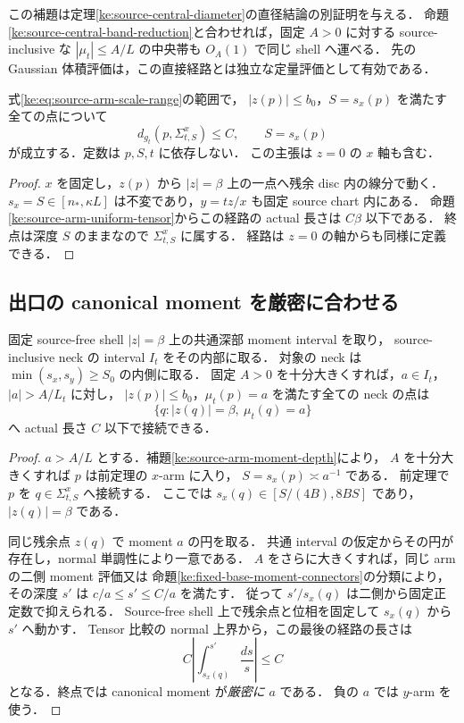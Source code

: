 この補題は定理\ref{ke:source-central-diameter}の直径結論の別証明を与える．
命題\ref{ke:source-central-band-reduction}と合わせれば，固定 $A>0$ に対する
source-inclusive な $|\mu_t|\le A/L$ の中央帯も $O_A(1)$ で同じ shell へ運べる．
先の Gaussian 体積評価は，この直接経路とは独立な定量評価として有効である．

\begin{theorem}
\label{ke:source-noncentral-shell-exit}
式\eqref{ke:eq:source-arm-scale-range}の範囲で，
$|z(p)|\le b_0$，$S=s_x(p)$ を満たす全ての点について
\begin{equation}\label{ke:eq:source-noncentral-shell-exit}
 d_{g_t}(p,\Sigma^x_{t,S})
 \le C,\qquad S=s_x(p)
\end{equation}
が成立する．定数は $p,S,t$ に依存しない．
この主張は $z=0$ の $x$ 軸も含む．
\end{theorem}

\begin{proof}
$x$ を固定し，$z(p)$ から $|z|=\beta$ 上の一点へ残余 disc 内の線分で動く．
$s_x=S\in[n_*,\kappa L]$ は不変であり，$y=tz/x$ も固定 source chart 内にある．
命題\ref{ke:source-arm-uniform-tensor}からこの経路の actual 長さは $C\beta$ 以下である．
終点は深度 $S$ のままなので $\Sigma^x_{t,S}$ に属する．
経路は $z=0$ の軸からも同様に定義できる．
\end{proof}

\subsection{出口の canonical moment を厳密に合わせる}

\begin{proposition}
\label{ke:source-noncentral-same-moment-exit}
固定 source-free shell $|z|=\beta$ 上の共通深部 moment interval を取り，
source-inclusive neck の interval $I_t$ をその内部に取る．
対象の neck は $\min(s_x,s_y)\ge S_0$ の内側に取る．
固定 $A>0$ を十分大きくすれば，$a\in I_t$，$|a|>A/L_t$ に対し，
$|z(p)|\le b_0$，$\mu_t(p)=a$ を満たす全ての neck の点は
\[
 \{q:|z(q)|=\beta,\ \mu_t(q)=a\}
\]
へ actual 長さ $C$ 以下で接続できる．
\end{proposition}

\begin{proof}
$a> A/L$ とする．補題\ref{ke:source-arm-moment-depth}により，
$A$ を十分大きくすれば $p$ は前定理の $x$-arm に入り，
$S=s_x(p)\asymp a^{-1}$ である．
前定理で $p$ を $q\in\Sigma^x_{t,S}$ へ接続する．
ここでは $s_x(q)\in[S/(4B),8BS]$ であり，$|z(q)|=\beta$ である．

同じ残余点 $z(q)$ で moment $a$ の円を取る．
共通 interval の仮定からその円が存在し，normal 単調性により一意である．
$A$ をさらに大きくすれば，同じ arm の二側 moment 評価又は
命題\ref{ke:fixed-base-moment-connectors}の分類により，その深度 $s'$ は
$c/a\le s'\le C/a$ を満たす．
従って $s'/s_x(q)$ は二側から固定正定数で抑えられる．
Source-free shell 上で残余点と位相を固定して $s_x(q)$ から $s'$ へ動かす．
Tensor 比較の normal 上界から，この最後の経路の長さは
\[
 C\left|\int_{s_x(q)}^{s'}\frac{ds}{s}\right|\le C
\]
となる．終点では canonical moment が\emph{厳密に} $a$ である．
負の $a$ では $y$-arm を使う．
\end{proof}

